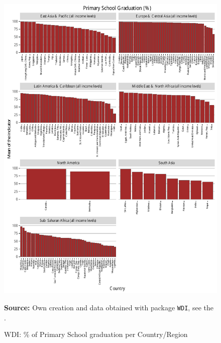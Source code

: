 \begin{figure}[H]
\begin{center}
\caption{WDI: \% of Primary School graduation per Country/Region}
\label{fig_wdi_primary}
\includegraphics[max height=.9\textheight]{../img/wdi_primary_school_graduation_perc.pdf}
\end{center}
\noindent \footnotesize{\textbf{Source:} Own creation and data obtained with package \texttt{WDI}, see the \cite{wb_r}.}
\end{figure}


